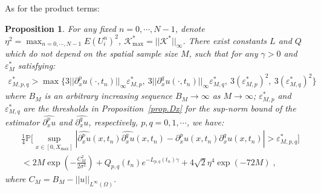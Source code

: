 \documentclass[a4paper,11pt]{article}
\newtheorem{prop}{Proposition}[section]
\theoremstyle{definition}
\begin{document}
As for the product terms:
\begin{prop}\label{prop.Dxx}
For any fixed $n=0,\cdots,N-1$, denote $\eta^2 = \max_{n=0,\cdots,N-1}E(U_i^n)^2$, $\mathcal{K}^*_{\max}=||\mathcal{K}^*||_\infty$. There exist constants $L$ and $Q$ which do not depend on the spatial sample size $M$, such that for any $\gamma>0$ and $\varepsilon_M^*$ satisfying:
\begin{align*}
\varepsilon_{M,p,q}^*>\max\{3||\partial_x^pu(\cdot,t_n)||_\infty\varepsilon^*_{M,p},~3||\partial_x^qu(\cdot,t_n)||_\infty\varepsilon^*_{M,q},~3(\varepsilon^*_{M,p})^2,~3(\varepsilon^*_{M,q})^2\}
\end{align*}
where $B_M$ is an arbitrary increasing sequence $B_M\to\infty$ as $M\to\infty$; $\varepsilon^*_{M,p}$ and $\varepsilon^*_{M,q}$ are the thresholds in Proposition~\ref{prop.Dx} for the sup-norm bound of the estimator $\widehat{\partial_x^pu}$ and $\widehat{\partial_x^qu}$, respectively, $p,q=0,1,\cdots$, we have:
\begin{align*}
&\frac{1}{4}\mathbb{P}\Big[\sup_{x\in[0,X_{\max}]}|\widehat{\partial_x^pu}(x,t_n)\widehat{\partial_x^qu}(x,t_n)-\partial_x^pu(x,t_n)\partial_x^qu(x,t_n)|>\varepsilon_{M,p,q}^*\Big] \nonumber\\
&< 2M \exp(-\frac{C_M^2}{2\sigma^2})+Q_{p,q}(t_n)e^{-L_{p,q}(t_n)\gamma}+4\sqrt{2}\eta^4\exp(-72M)\;,
\end{align*}	
where $C_M = B_M-||u||_{L^\infty(\Omega)}$.
\end{prop}
\end{document}
